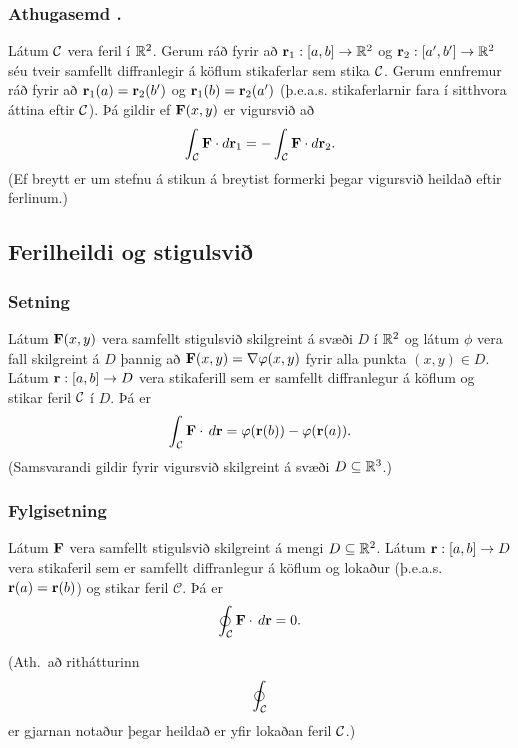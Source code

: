 \subsubsection{Athugasemd \kaflanr.}
Látum $\cal C$ vera feril í ${\mathbb R}^2$. Gerum ráð fyrir að $\mbox{${\bf r}$}_1:[a,b]\rightarrow {\mathbb R}^2$ og  $\mbox{${\bf r}$}_2:[a',b']\rightarrow {\mathbb R}^2$ séu tveir samfellt diffranlegir á köflum stikaferlar sem stika $\cal C$.  Gerum ennfremur ráð fyrir að $\mbox{${\bf r}$}_1(a)=\mbox{${\bf r}$}_2(b')$ og $\mbox{${\bf r}$}_1(b)=\mbox{${\bf r}$}_2(a')$ (þ.e.a.s. stikaferlarnir fara í sitthvora áttina eftir $\cal C$).  Þá gildir ef $\mbox{${\bf F}$}(x,y)$ er vigursvið að 
$$\int_{\cal C} \mbox{${\bf F}$}\cdot d\mbox{${\bf r}$}_1=-\int_{\cal C} \mbox{${\bf F}$}\cdot d\mbox{${\bf r}$}_2.$$
(Ef breytt er um stefnu á stikun á breytist formerki þegar vigursvið heildað eftir ferlinum.)





\subsection{Ferilheildi og stigulsvið} 

\subsubsection{Setning \rtask{}}
Látum $\mbox{${\bf F}$}(x,y)$ vera samfellt stigulsvið skilgreint á svæði $D$ í ${\mathbb R}^2$ og látum $\phi$ vera fall skilgreint á $D$ þannig að $\mbox{${\bf F}$}(x,y)=\nabla \varphi(x,y)$ fyrir alla punkta $(x,y)\in D$.   Látum $\mbox{${\bf r}$}:[a,b]\rightarrow D$ vera stikaferill sem er samfellt diffranlegur á köflum og stikar feril $\cal C$ í $D$.  Þá er
$$\int_{\cal C} \mbox{${\bf F}$}\cdot \,d\mbox{${\bf r}$}=\varphi(\mbox{${\bf r}$}(b))-\varphi(\mbox{${\bf r}$}(a)).$$
(Samsvarandi gildir fyrir vigursvið skilgreint á svæði $D\subseteq {\mathbb R}^3$.)






\subsubsection{Fylgisetning \rtask{} \label{thm:atob}}
Látum $\mbox{${\bf F}$}$ vera samfellt stigulsvið
skilgreint á mengi $D\subseteq {\mathbb R}^2$.   Látum $\mbox{${\bf r}$}:[a,b]\rightarrow D$ vera
stikaferil sem er samfellt diffranlegur á köflum og lokaður (þ.e.a.s.\
$\mbox{${\bf r}$}(a)=\mbox{${\bf r}$}(b)$) og stikar feril $\mathcal{C}$.  Þá er $$\oint_{\cal C}  \mbox{${\bf F}$}\cdot \,d\mbox{${\bf r}$}=0.$$

(Ath.~að rithátturinn $$\oint_{\cal C}$$ er gjarnan notaður þegar heildað er yfir lokaðan feril $\cal C$.)




